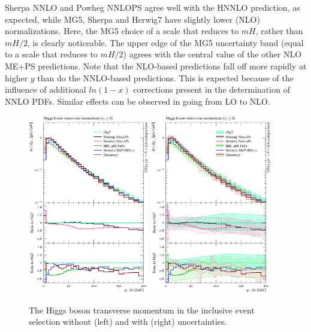 Sherpa NNLO and Powheg NNLOPS agree well with the HNNLO prediction, as
expected, while MG5, Sherpa and Herwig7 have slightly lower (NLO)
normalizations. Here, the MG5 choice of a scale that reduces to $mH$,
rather than $mH/2$, is clearly noticeable. The upper edge of the MG5
uncertainty band (equal to a scale that reduces to $mH/2$) agrees with
the central value of the other NLO ME+PS predictions. Note that the
NLO-based predictions fall off more rapidly at higher $y$ than do the
NNLO-based predictions. This is expected because of the influence of
additional $ln(1-x)$ corrections present in the determination of NNLO
PDFs.  Similar effects can be observed in going from LO to NLO.


\begin{figure}[t!]
  \centering
  \includegraphics[width=0.47\textwidth]{figures/hjetscomp_u_H_pT_incl.pdf}
  \hfill
  \includegraphics[width=0.47\textwidth]{figures/hjetscomp_H_pT_incl.pdf}
  \caption{
    The Higgs boson transverse momentum in the inclusive event selection
    without (left) and with (right) uncertainties.
    \label{fig:higgscomp:results:inclobs:hpt}
  }
\end{figure}

